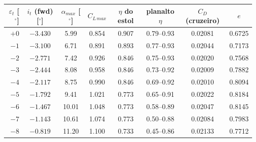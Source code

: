 \begin{tabular}{rccccccc}
\toprule
$\varepsilon_t$ [$^\circ$] & $i_t$ (fwd) [$^\circ$] & $\alpha_{max}$ [$^\circ$] & $C_{L\,max}$ & $\eta$ do estol & planalto $\eta$ & $C_D$ (cruzeiro) & $e$ \\
\midrule
$+0$ & $-3.430$ & 5.99 & 0.854 & 0.907 & 0.79--0.93 & 0.02081 & 0.6725 \\
$-1$ & $-3.100$ & 6.71 & 0.891 & 0.893 & 0.77--0.93 & 0.02044 & 0.7173 \\
$-2$ & $-2.771$ & 7.42 & 0.926 & 0.846 & 0.75--0.93 & 0.02020 & 0.7568 \\
$-3$ & $-2.444$ & 8.08 & 0.958 & 0.846 & 0.73--0.92 & 0.02009 & 0.7882 \\
$-4$ & $-2.117$ & 8.75 & 0.990 & 0.846 & 0.69--0.92 & 0.02010 & 0.8094 \\
$-5$ & $-1.792$ & 9.41 & 1.021 & 0.773 & 0.65--0.91 & 0.02022 & 0.8184 \\
$-6$ & $-1.467$ & 10.01 & 1.048 & 0.773 & 0.58--0.89 & 0.02047 & 0.8145 \\
$-7$ & $-1.143$ & 10.61 & 1.074 & 0.773 & 0.50--0.88 & 0.02084 & 0.7983 \\
$-8$ & $-0.819$ & 11.20 & 1.100 & 0.733 & 0.45--0.86 & 0.02133 & 0.7712 \\
\bottomrule
\end{tabular}
